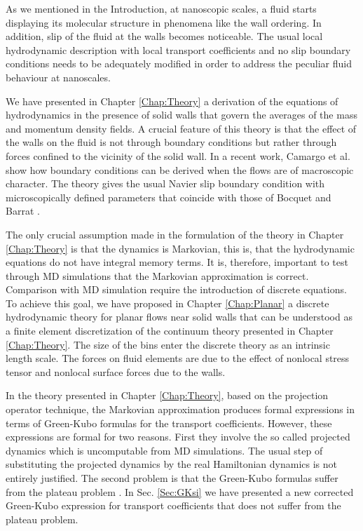\documentclass[b5paper,openright,10pt]{book}
\begin{document}
As we mentioned in the Introduction, at nanoscopic scales,  a fluid
starts displaying its  molecular structure in phenomena  like the wall
ordering.   In  addition, slip  of  the  fluid  at the  walls  becomes
noticeable.   The  usual  local hydrodynamic  description  with  local
transport coefficients  and no  slip boundary  conditions needs  to be
adequately modified in  order to address the  peculiar fluid behaviour
at  nanoscales. 

We  have presented  in  Chapter \ref{Chap:Theory}  a  derivation of  the
equations of hydrodynamics in the  presence of solid walls that govern
the  averages of  the  mass  and momentum  density  fields. A  crucial
feature of this theory is that the effect of the walls on the fluid is
not through boundary conditions but  rather through forces confined to
the vicinity  of the solid wall.  In a recent work, Camargo et al. \cite{CamargoBC2018} show  how  boundary  conditions  can  be  derived  when  the  flows  are  of
macroscopic  character.  The  theory  gives  the usual  Navier  slip
boundary  condition  with   microscopically  defined  parameters  that
coincide      with      those      of     Bocquet      and      Barrat
\cite{Bocquet1994}.

The only crucial  assumption made in the formulation of  the theory in
Chapter \ref{Chap:Theory} is  that the dynamics  is Markovian, this  is, that
the hydrodynamic equations do not  have integral memory terms.  It is,
therefore, important to test through MD simulations that the Markovian
approximation is  correct.  Comparison with MD  simulation require the
introduction  of discrete  equations. To  achieve this  goal, we  have
proposed in Chapter \ref{Chap:Planar} a  discrete hydrodynamic theory  for planar
flows near  solid walls  that can  be understood  as a  finite element
discretization of  the continuum  theory presented in Chapter \ref{Chap:Theory}.
The size of the bins enter  the discrete theory as an intrinsic length
scale. The forces on fluid elements are due to the effect of nonlocal
stress tensor and nonlocal surface forces due to the walls.

In the  theory presented in Chapter \ref{Chap:Theory}, based  on the
projection  operator technique,  the Markovian  approximation produces
formal expressions in  terms of Green-Kubo formulas  for the transport
coefficients.    However,  these   expressions  are   formal  for   two
reasons. First they involve the  so called projected dynamics which is
uncomputable from MD  simulations. The usual step  of substituting the
projected dynamics  by the real  Hamiltonian dynamics is  not entirely
justified. The second  problem is that the  Green-Kubo formulas suffer
from the plateau problem \cite{Kirkwood1949,Espanol1992}.  
In Sec. \ref{Sec:GKsi} we have  presented a   new  corrected   Green-Kubo  expression   for  transport
coefficients that does not suffer from the plateau problem.
\end{document}
